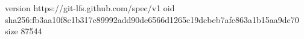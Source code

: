 version https://git-lfs.github.com/spec/v1
oid sha256:fb3aa10f8c1b317c89992add90de6566d1265c19dcbeb7afc863a1b15aa9dc70
size 87544
